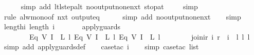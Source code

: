 \begin{isabellebody}
\ \ \ \ \isamarkupfalse%
\ {\isacharparenleft}simp\ add{\isacharcolon}\ ltl{\isacharunderscore}step{\isacharunderscore}alt\ no{\isacharunderscore}output{\isacharunderscore}none{\isacharunderscore}nxt\ stop{\isacharunderscore}at{\isacharunderscore}{}{\isacharparenright}\isanewline
\ \ \ \isamarkupfalse%
\ simp\isanewline
\ \ \ \isamarkupfalse%
\ {\isacharparenleft}rule\ alw{\isacharunderscore}mono{\isacharbrackleft}of\ {\isachardoublequoteopen}nxt\ {\isacharparenleft}output{\isacharunderscore}eq\ {\isacharbrackleft}{\isacharbrackright}{\isacharparenright}{\isachardoublequoteclose}{\isacharbrackright}{\isacharparenright}\isanewline
\ \ \ \isamarkupfalse%
\ {\isacharparenleft}simp\ add{\isacharcolon}\ no{\isacharunderscore}output{\isacharunderscore}none{\isacharunderscore}nxt{\isacharparenright}\isanewline
\ \ \isamarkupfalse%
\ simp%
\endisatagproof
{\isafoldproof}%
%
\isadelimproof
\isanewline
%
\endisadelimproof
\isanewline
{}\isamarkupfalse%
\ length{\isacharunderscore}i{\isacharunderscore}{}{\isacharcolon}\ {\isachardoublequoteopen}length\ i\ {\isacharequal}\ {}\ {\isasymLongrightarrow}\isanewline
\ \ \ \ apply{\isacharunderscore}guards\isanewline
\ \ \ \ \ \ \ \ {\isacharbrackleft}Eq\ {\isacharparenleft}V\ {\isacharparenleft}I\ {}{\isacharparenright}{\isacharparenright}\ {\isacharparenleft}L\ l{}{\isacharparenright}{\isacharcomma}\ Eq\ {\isacharparenleft}V\ {\isacharparenleft}I\ {}{\isacharparenright}{\isacharparenright}\ {\isacharparenleft}L\ l{}{\isacharparenright}{\isacharcomma}\ Eq\ {\isacharparenleft}V\ {\isacharparenleft}I\ {}{\isacharparenright}{\isacharparenright}\ {\isacharparenleft}L\ l{}{\isacharparenright}{\isacharbrackright}\isanewline
\ \ \ \ \ \ \ \ {\isacharparenleft}join{\isacharunderscore}ir\ i\ r{\isacharparenright}\ {\isacharequal}\ {\isacharparenleft}i\ {\isacharequal}\ {\isacharbrackleft}l{}{\isacharcomma}\ l{}{\isacharcomma}\ l{}{\isacharbrackright}{\isacharparenright}{\isachardoublequoteclose}\isanewline
%
\isadelimproof
\ \ %
\endisadelimproof
%
\isatagproof
{}\isamarkupfalse%
\ {\isacharparenleft}simp\ add{\isacharcolon}\ apply{\isacharunderscore}guards{\isacharunderscore}def{\isacharparenright}\isanewline
\ \ \isamarkupfalse%
\ {\isacharparenleft}case{\isacharunderscore}tac\ i{\isacharparenright}\isanewline
\ \ \isamarkupfalse%
\ {\isacharparenleft}simp{\isacharcomma}\ case{\isacharunderscore}tac\ list{\isacharparenright}\isanewline

\end{isabellebody}
